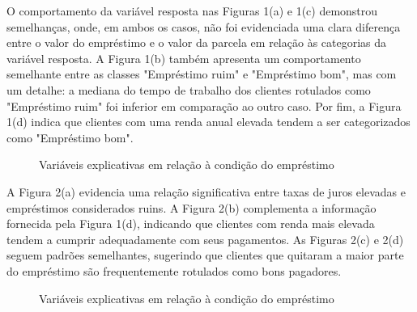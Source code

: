 O comportamento da variável resposta nas Figuras 1(a) e 1(c) demonstrou semelhanças, onde, em ambos os casos,
não foi evidenciada uma clara diferença entre o valor do empréstimo e o valor da parcela em relação às
categorias da variável resposta. A Figura 1(b) também apresenta um comportamento semelhante entre as classes
"Empréstimo ruim" e "Empréstimo bom", mas com um detalhe: a mediana do tempo de trabalho dos clientes rotulados 
como "Empréstimo ruim" foi inferior em comparação ao outro caso. Por fim, a Figura 1(d) indica que clientes 
com uma renda anual elevada tendem a ser categorizados como "Empréstimo bom".


\begin{figure}[H]
  \centering
  \vspace{.5cm}
  \vspace{.5cm}
 \caption{Variáveis explicativas em relação à condição do empréstimo}
  
 \label{fig:exp_boxplot2}
\end{figure}

A Figura 2(a) evidencia uma relação significativa entre taxas de juros elevadas e empréstimos 
considerados ruins. A Figura 2(b) complementa a informação fornecida pela Figura 1(d),
indicando que clientes com renda mais elevada tendem a cumprir adequadamente com seus pagamentos.
As Figuras 2(c) e 2(d) seguem padrões semelhantes, sugerindo que clientes que quitaram a 
maior parte do empréstimo são frequentemente rotulados como bons pagadores.

\begin{figure}[H]
    \centering
    \vspace{.5cm}
    \vspace{.5cm}
    
    \label{fig:exp_bar1}
    \caption{Variáveis explicativas em relação à condição do empréstimo}
\end{figure}


